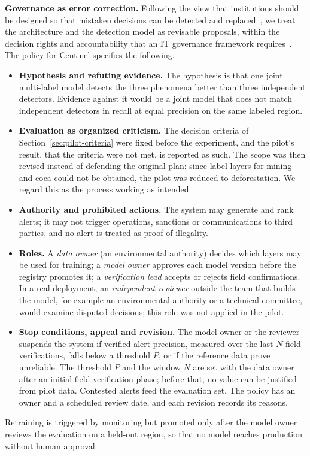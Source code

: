 \documentclass{article}
\begin{document}
\textbf{Governance as error correction.}
Following the view that institutions should be designed so that mistaken
decisions can be detected and replaced~\cite{popper1945}, we treat the
architecture and the detection model as revisable proposals, within the decision
rights and accountability that an IT governance framework
requires~\cite{weill2004}. The policy for Centinel specifies the following.
\begin{itemize}
    \item \textbf{Hypothesis and refuting evidence.} The hypothesis is that one joint multi-label model detects the three phenomena better than three independent detectors. Evidence against it would be a joint model that does not match independent detectors in recall at equal precision on the same labeled region.
    \item \textbf{Evaluation as organized criticism.} The decision criteria of Section~\ref{sec:pilot-criteria} were fixed before the experiment, and the pilot's result, that the criteria were not met, is reported as such. The scope was then revised instead of defending the original plan: since label layers for mining and coca could not be obtained, the pilot was reduced to deforestation. We regard this as the process working as intended.
    \item \textbf{Authority and prohibited actions.} The system may generate and rank alerts; it may not trigger operations, sanctions or communications to third parties, and no alert is treated as proof of illegality.
    \item \textbf{Roles.} A \emph{data owner} (an environmental authority) decides which layers may be used for training; a \emph{model owner} approves each model version before the registry promotes it; a \emph{verification lead} accepts or rejects field confirmations. In a real deployment, an \emph{independent reviewer} outside the team that builds the model, for example an environmental authority or a technical committee, would examine disputed decisions; this role was not applied in the pilot.
    \item \textbf{Stop conditions, appeal and revision.} The model owner or the reviewer suspends the system if verified-alert precision, measured over the last $N$ field verifications, falls below a threshold $P$, or if the reference data prove unreliable. The threshold $P$ and the window $N$ are set with the data owner after an initial field-verification phase; before that, no value can be justified from pilot data. Contested alerts feed the evaluation set. The policy has an owner and a scheduled review date, and each revision records its reasons.
\end{itemize}
Retraining is triggered by monitoring but promoted only after the model owner
reviews the evaluation on a held-out region, so that no model reaches
production without human approval.
\end{document}
